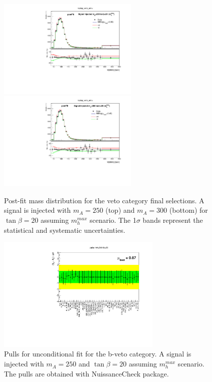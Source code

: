 \begin{figure}[!hb]
  \centering
  \includegraphics[width=0.6\textwidth]{figure/limits/post_fit_250.pdf}
  \includegraphics[width=0.6\textwidth]{figure/limits/post_fit_ma300.pdf}
  \caption{Post-fit \mmc mass distribution for the veto category final selections. A signal is injected with 
	$m_A=250$ (top) and  $m_A=300$ (bottom) for $\tan\beta=20$ assuming $m_h^{max}$ scenario. The 1$\sigma$ bands 
	represent the statistical and systematic uncertainties.  }

\end{figure}

\begin{figure}[!hb]
  \centering
  \includegraphics[width=0.7\textwidth]{figure/limits/pulls_250.pdf}
  \caption{Pulls for unconditional fit for the b-veto category. A signal is injected with 
	$m_A=250$ and  $\tan\beta=20$ assuming $m_h^{max}$ scenario. The pulls are obtained with NuissanceCheck package.  }

\end{figure}

